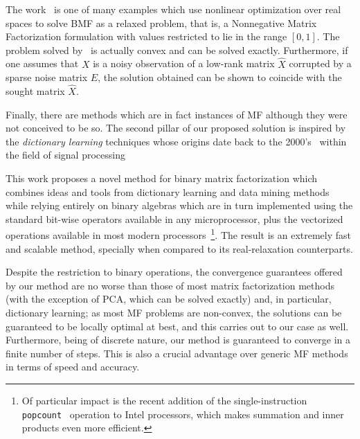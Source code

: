 \documentclass[twocolumn]{IEEEtran}
\begin{document}
The work~\cite{bmf07} is one of many examples which use nonlinear optimization over real spaces to solve BMF as a relaxed problem, that is, a Nonnegative Matrix Factorization formulation with values restricted to lie in the range $[0,1]$. The problem solved by~\cite{bmf07} is actually convex and can be solved exactly. Furthermore, if one assumes that $X$ is a noisy observation of a low-rank matrix $\hat{X}$ corrupted by a sparse noise matrix $E$, the solution obtained can be shown to coincide with the sought matrix $\hat{X}$.

 
Finally, there are methods which are in fact instances of MF although they were not conceived to be so. The second pillar of our proposed solution is inspired by the \emph{dictionary learning} techniques whose origins date back to the 2000's~\cite{lewicki99,engan00,aharon06} within the field of signal processing

This work proposes a novel method for binary matrix factorization which combines ideas and tools from dictionary learning and data mining methods while relying entirely on binary algebras which are in turn implemented using the standard bit-wise operators available in any microprocessor, plus the vectorized operations available in most modern processors~\footnote{Of particular impact is the recent addition of the single-instruction \texttt{popcount}~\cite{popcount} operation to Intel processors, which makes summation and inner products even more efficient.}. The result is an extremely fast and scalable method, specially when compared to its real-relaxation counterparts. 

Despite the restriction to binary operations, the convergence guarantees offered by our method are no worse than those of most matrix factorization methods (with the exception of PCA, which can be solved exactly) and, in particular, dictionary learning;  as most MF problems are non-convex, the solutions can be guaranteed to be locally optimal at best, and this carries out to our case as well. Furthermore, being of discrete nature, our method is guaranteed to converge in a finite number of steps. This is also a crucial advantage over generic MF methods in terms of speed and accuracy.

\end{document}
